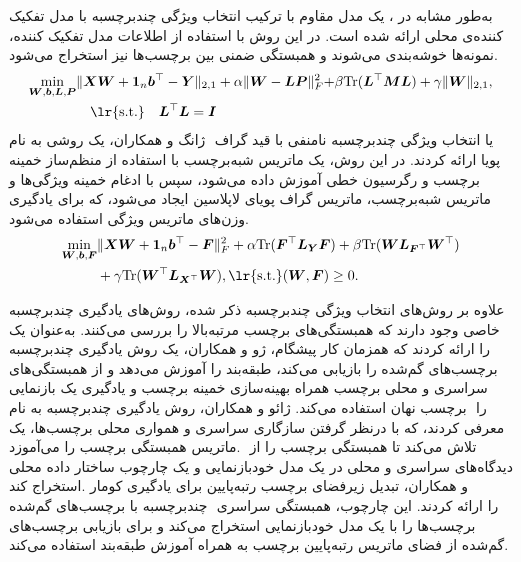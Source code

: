 	به‌طور مشابه در \cite{fan2021multi}، یک مدل مقاوم با ترکیب انتخاب ویژگی چندبرچسبه با مدل تفکیک کننده‌ی محلی ارائه شده است.
	در این روش با استفاده از اطلاعات مدل تفکیک کننده، نمونه‌ها خوشه‌بندی می‌شوند و همبستگی ضمنی بین برچسب‌ها نیز استخراج می‌شود.
	\begin{align}
		\min_{{\bm{W}} , {\bm{b}}, {\bm{L}}, {\bm{P}}}&\lVert{\bm{XW}}+{\bm{1}}_n {\bm{b}}^\top - {\bm{Y}}\rVert_{2,1} + \alpha \lVert{\bm{W}}-{\bm{LP}}\lVert^2_F + \beta\mathrm{Tr}({\bm{L}}^\top {\bm{M}}{\bm{L}}) +\gamma\lVert{\bm{W}}\lVert_{2,1},  \nonumber\\
		&\quad{\text{\lr{s.t.}}\quad}{\bm{L}}^\top {\bm{L}}={\bm{I}}
	\end{align}
 ژانگ و همکاران\cite{zhang2022non}، یک روشی به نام ‎‎ یا انتخاب ویژگی چندبرچسبه ‌نامنفی با قید گراف پویا ارائه کردند. در این روش، یک ماتریس شبه‌برچسب با استفاده از منظم‌ساز خمینه‌‎ برچسب و رگرسیون خطی آموزش داده می‌شود، سپس با ادغام خمینه‌ ویژگی‌ها و ماتریس شبه‌برچسب، ماتریس گراف پویای لاپلاسین ایجاد می‌شود، که برای یادگیری وزن‌های ماتریس ویژگی استفاده می‌شود.
	\begin{align}
		\min_{\bm{W} , \bm{b}, \bm{F}}&\lVert\bm{XW}+\bm{1}_n \bm{b}^\top - \bm{F}\rVert^2_F + \alpha\mathrm{Tr}( \bm{F}^\top \bm{L}_{\bm{Y}} \bm{F}) +\beta \mathrm{Tr}( \bm{WL}_{\bm{F}^\top} \bm{W}^\top) \nonumber\\
		&+\gamma \mathrm{Tr}(\bm{W}^\top \bm{L}_{\bm{X}^\top} \bm{W}),{\text{\lr{s.t.}}}({\bm{W},\bm{F}})\geq 0.
	\end{align}
	
	علاوه بر روش‌های انتخاب ویژگی چندبرچسبه ذکر شده، روش‌های یادگیری چندبرچسبه خاصی وجود دارند که همبستگی‌های برچسب مرتبه‌بالا را بررسی می‌کنند. به‌عنوان یک کار پیشگام، ژو و همکاران\cite{zhu2017multi}، یک روش یادگیری چندبرچسبه‎‎ را ارائه کردند که همزمان برچسب‌های گم‌شده را بازیابی می‌کند،	طبقه‌بند را آموزش می‌دهد و از همبستگی‌های سراسری و محلی برچسب همراه بهینه‌سازی خمینه‌ برچسب و یادگیری یک بازنمایی‌ برچسب نهان استفاده می‌کند. ژائو و همکاران\cite{zhao2022learning}، روش یادگیری چندبرچسبه به نام ‎‎ را معرفی کردند، که با در‌نظر گرفتن سازگاری سراسری و همواری محلی برچسب‌ها، یک ماتریس همبستگی برچسب را می‌آموزد. ‎ تلاش می‌کند تا همبستگی برچسب را از دیدگاه‌های سراسری و محلی در یک مدل خودبازنمایی و یک چارچوب ساختار داده محلی استخراج کند. ‎کومار‎ و همکاران\cite{kumar2022low}، تبدیل زیرفضای برچسب رتبه‌پایین برای یادگیری چند‌برچسبه با برچسب‌های گم‌شده ‎‎ را ارائه کردند. این چارچوب، همبستگی سراسری برچسب‌ها را با یک مدل خود‌بازنمایی استخراج می‌کند و برای بازیابی برچسب‌های گم‌شده از فضای ماتریس رتبه‌پایین برچسب به همراه آموزش طبقه‌بند استفاده می‌کند.
